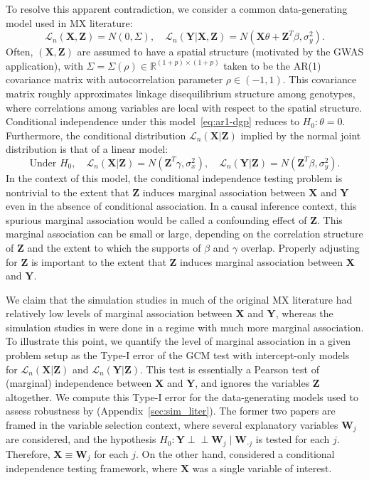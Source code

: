 \documentclass[aos]{imsart}
\theoremstyle{plain}
\theoremstyle{remark}
\newcommand{\R}{\mathbb{R}}								%
\newcommand{\independent}{{\perp \! \! \! \perp}}		%
\newcommand{\prx}{\bm X}								%
\newcommand{\prz}{\bm Z}								%
\newcommand{\pry}{{\bm Y}}								%
\newcommand{\law}{\mathcal L}							%
\begin{document}
To resolve this apparent contradiction, we consider a common data-generating model used in MX literature:
\begin{equation}
    \law_n(\prx, \prz) = N(0, \Sigma), \quad \law_n(\pry|\prx,\prz) = N(\prx \theta + \prz^T \beta, \sigma^2_y).
    \label{eq:ar1-dgp}
\end{equation}
Often, $(\prx, \prz)$ are assumed to have a spatial structure (motivated by the GWAS application), with $\Sigma = \Sigma(\rho) \in \R^{(1+p) \times (1+p)}$ taken to be the AR(1) covariance matrix with autocorrelation parameter $\rho \in (-1,1)$. This covariance matrix roughly approximates linkage disequilibrium structure among genotypes, where correlations among variables are local with respect to the spatial structure. Conditional independence under this model~\eqref{eq:ar1-dgp} reduces to $H_0: \theta = 0$. Furthermore, the conditional distribution $\law_n(\prx|\prz)$ implied by the normal joint distribution is that of a linear model:
\begin{equation}
    \text{Under } H_0, \quad  \law_n(\prx | \prz) = N(\prz^T \gamma, \sigma^2_x), \quad \law_n(\pry|\prz) = N(\prz^T \beta, \sigma^2_y).
\end{equation}
In the context of this model, the conditional independence testing problem is nontrivial to the extent that $\prz$ induces marginal association between $\prx$ and $\pry$ even in the absence of conditional association. In a causal inference context, this spurious marginal association would be called a confounding effect of $\prz$. This marginal association can be small or large, depending on the correlation structure of $\prz$ and the extent to which the supports of $\beta$ and $\gamma$ overlap. Properly adjusting for $\prz$ is important to the extent that $\prz$ induces marginal association between $\prx$ and $\pry$.

We claim that the simulation studies in much of the original MX literature had relatively low levels of marginal association between $\prx$ and $\pry$, whereas the simulation studies in \citet{Li2022} were done in a regime with much more marginal association. To illustrate this point, we quantify the level of marginal association in a given problem setup as the Type-I error of the GCM test with intercept-only models for $\law_n(\prx|\prz)$ and $\law_n(\pry|\prz)$. This test is essentially a Pearson test of (marginal) independence between $\prx$ and $\pry$, and ignores the variables $\prz$ altogether. We compute this Type-I error for the data-generating models used to assess robustness by \citet{CetL16, Liu2022a, Li2022} (Appendix~\ref{sec:sim_liter}). The former two papers are framed in the variable selection context, where several explanatory variables $\bm W_j$ are considered, and the hypothesis $H_0: \pry \independent \bm W_j \mid \bm W_{\text{-}j}$ is tested for each $j$. Therefore, $\prx \equiv \bm W_j$ for each $j$. On the other hand, \citet{Li2022} considered a conditional independence testing framework, where $\prx$ was a single variable of interest.
\end{document}
